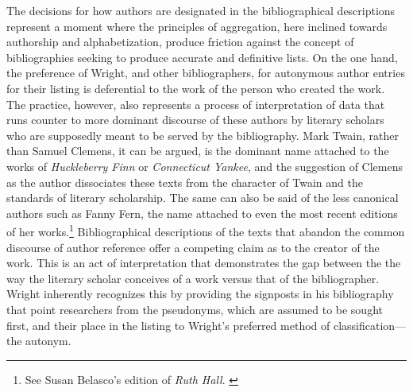The decisions for how authors are designated in the bibliographical descriptions represent a moment where the principles of aggregation, here inclined towards authorship and alphabetization, produce friction against the concept of bibliographies seeking to produce accurate and definitive lists. On the one hand, the preference of Wright, and other bibliographers, for autonymous author entries for their listing is deferential to the work of the person who created the work. The practice, however, also represents a process of interpretation of data that runs counter to more dominant discourse of these authors by literary scholars who are supposedly meant to be served by the bibliography. Mark Twain, rather than Samuel Clemens, it can be argued, is the dominant name attached to the works of \textit{Huckleberry Finn} or \textit{Connecticut Yankee}, and the suggestion of Clemens as the author dissociates these texts from the character of Twain and the standards of literary scholarship. The same can also be said of the less canonical authors such as Fanny Fern, the name attached to even the most recent editions of her works.\footnote{See Susan Belasco's edition of \textit{Ruth Hall}. \autocite{fern_ruth_1997}} Bibliographical descriptions of the texts that abandon the common discourse of author reference offer a competing claim as to the creator of the work. This is an act of interpretation that demonstrates the gap between the the way the literary scholar conceives of a work versus that of the bibliographer. Wright inherently recognizes this by providing the signposts in his bibliography that point researchers from the pseudonyms, which are assumed to be sought first, and their place in the listing to Wright's preferred method of classification---the autonym. 

